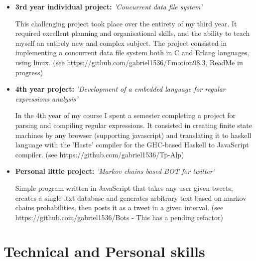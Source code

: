 \documentclass[11pt,a4paper,sans]{moderncv}        %
\begin{document}
{\begin{itemize}
{\small{I was part of a 2-person project which consisted in creating a tiger compiler in Haskell. This required strong team-working skills and high technical ability. (see https://gitlab.com/DavidGiordana/TigerHaskell) }}

\item{\textbf{3rd year individual project:} \textit{'Concurrent data file system'}

\vspace{3pt}

\small{This challenging project took place over the entirety of my third year. It required excellent planning and organisational skills, and the ability to teach myself an entirely new and complex subject. The project consisted in implementing a concurrent data file system both in C and Erlang languages, using linux. (see https://github.com/gabriel1536/Emotion98.3, ReadMe in progress)}}

\vspace{6pt}

\item{\textbf{4th year project:} \textit{'Development of a embedded language for regular expressions analysis'}

\vspace{3pt}

\small{In the 4th year of my course I spent a semester completing a project for parsing and compiling regular expressions. It consisted in creating finite state machines by any browser (supporting javascript) and translating it to haskell language with the 'Haste' compiler for the GHC-based Haskell to JavaScript compiler. (see https://github.com/gabriel1536/Tp-Alp)}}
\vspace{6pt}
\item{\textbf{Personal little project:} \textit{'Markov chains based BOT for twitter'}

\vspace{3pt}

\small{Simple program written in JavaScript that takes any user given tweets, creates a single .txt database and generates arbitrary text based on markov chains probabilities, then posts it as a tweet in a given interval. (see https://github.com/gabriel1536/Bots - This has a pending refactor)}}

\end{itemize}

\section{Technical and Personal skills}

}
\end{document}
